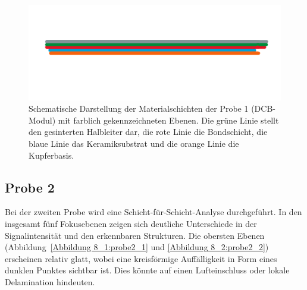 \begin{figure}[htbp]
    \centering
    \includegraphics[scale=0.75]{Bilder/probelinie1}
    \caption{Schematische Darstellung der Materialschichten der Probe 1 (DCB-Modul) mit farblich gekennzeichneten Ebenen. Die grüne Linie stellt den gesinterten Halbleiter dar, die rote Linie die Bondschicht, die blaue Linie das Keramiksubstrat und die orange Linie die Kupferbasis.}
    \label{Abbildung 7 :Schematische Darstellung der Materialschichten der Probe 1 (DCB-Modul) mit farblich gekennzeichneten Ebenen. Die grüne Linie stellt den gesinterten Halbleiter dar, die rote Linie die Bondschicht, die blaue Linie das Keramiksubstrat und die orange Linie die Kupferbasis.}
\end{figure}
\vspace{0.5cm}
\subsection{Probe 2}
Bei der zweiten Probe wird eine Schicht-für-Schicht-Analyse durchgeführt. In den insgesamt fünf Fokusebenen zeigen sich deutliche Unterschiede in der Signalintensität und den erkennbaren Strukturen. Die obersten Ebenen (Abbildung~\ref{Abbildung 8_1:probe2_1} und \ref{Abbildung 8_2:probe2_2}) erscheinen relativ glatt, wobei eine kreisförmige Auffälligkeit in Form eines dunklen Punktes sichtbar ist. Dies könnte auf einen Lufteinschluss oder lokale Delamination hindeuten.

